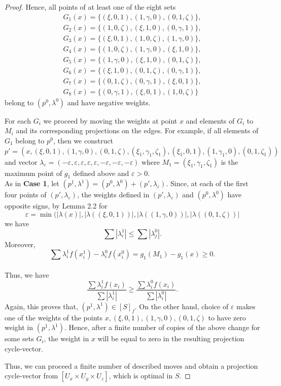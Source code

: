 \documentclass[12p]{article}
\numberwithin{equation}{section}
\begin{document}
\begin{proof}
Hence, all points of at least one of the eight sets 
\begin{align*}
    G_1(x)=\{(\xi,0,1),(1,\gamma,0),(0,1,\zeta)\}, \\
    G_2(x)=\{(1,0,\zeta),(\xi,1,0),(0,\gamma,1)\}, \\
    G_3(x)=\{(\xi,0,1),(1,0,\zeta),(1,\gamma,0)\}, \\
    G_4(x)=\{(1,0,\zeta),(1,\gamma,0),(\xi,1,0)\}, \\
    G_5(x)=\{(1,\gamma,0),(\xi,1,0),(0,1,\zeta)\}, \\
    G_6(x)=\{(\xi,1,0),(0,1,\zeta),(0,\gamma,1)\}, \\
    G_7(x)=\{(0,1,\zeta),(0,\gamma,1),(\xi,0,1)\},\\
    G_8(x)=\{(0,\gamma,1),(\xi,0,1),(1,0,\zeta)\}
\end{align*}
belong to \((p^0,\lambda^0)\) and have negative weights.
    
For each \(G_i\) we proceed by moving the weights at point \(x\) and elements of \(G_i\) to \(M_i\) and its corresponding projections on the edges. For example, if all elements of \(G_1\) belong to \(p^0\), then we construct
\(p'=(x,(\xi,0,1),(1,\gamma,0),(0,1,\zeta),(\xi_1,\gamma_1,\zeta_1),(\xi_1,0,1),(1,\gamma_1,0),(0,1,\zeta_1))\)
and vector
\(
\lambda_\varepsilon=(-\varepsilon,\varepsilon,\varepsilon,\varepsilon,\varepsilon,-\varepsilon,-\varepsilon,-\varepsilon)
\)
where \(M_1=(\xi_1,\gamma_1,\zeta_1)\) is the maximum point of \(g_1\) defined above and \(\varepsilon>0\). \\ As in \textbf{Case 1}, let \((p^1,\lambda^1)=(p^0,\lambda^0)+(p',\lambda_\varepsilon).\) Since, at each of the first four points of \((p',\lambda_\varepsilon)\), the weights defined in \((p',\lambda_\varepsilon)\) and \((p^0,\lambda^0)\) have opposite signs, by Lemma 2.2 for \[\varepsilon=\min(|\lambda(x)|,|\lambda((\xi,0,1))|,|\lambda((1,\gamma,0))|,|\lambda((0,1,\zeta))|\] we have 
\[
\sum|\lambda_i^1| \le \sum |\lambda_j^0|.
\]
Moreover, \[
\sum \lambda^1_if(x^1_i)-\lambda^0_if(x^0_i)=g_1(M_1)-g_1(x) \ge 0.\]\\
Thus, we have
\[
\frac{\sum\lambda^1_if(x_i)}{\sum|\lambda^1_i|} \ge \frac{\sum\lambda^0_if(x_i)}{\sum|\lambda^0_i|}.
\]
Again, this proves that, \((p^1,\lambda^1) \in [S]_{f}\).
On the other hand, choice of \(\varepsilon\) makes one of the weights of the points \(x,(\xi,0,1),(1,\gamma,0),(0,1,\zeta)\) to have zero weight in \((p^1,\lambda^1)\). Hence, after a finite number of copies of the above change for some sets \(G_i\), the weight in \(x\)  will be equal to zero in the resulting projection cycle-vector. 

Thus, we can proceed a finite number of described moves and obtain a projection cycle-vector from \([U_x \times U_y \times U_z]\), which is optimal in \(S\).
\end{proof}
\end{document}
